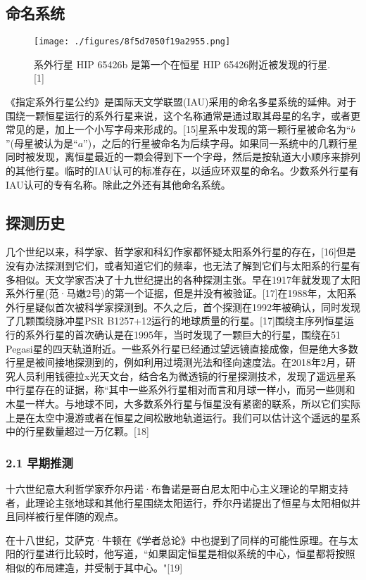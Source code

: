 \subsection{ 命名系统}
\begin{figure}[ht]
\centering
\texttt{[image: ./figures/8f5d7050f19a2955.png]}
\caption{系外行星 HIP 65426b 是第一个在恒星 HIP 65426附近被发现的行星.[1]} \label{fig_TYXWXX_1}
\end{figure}
《指定系外行星公约》是国际天文学联盟(IAU)采用的命名多星系统的延伸。对于围绕一颗恒星运行的系外行星来说，这个名称通常是通过取其母星的名字，或者更常见的是，加上一个小写字母来形成的。[15]星系中发现的第一颗行星被命名为“$b$”(母星被认为是“$a$”)，之后的行星被命名为后续字母。如果同一系统中的几颗行星同时被发现，离恒星最近的一颗会得到下一个字母，然后是按轨道大小顺序来排列的其他行星。临时的IAU认可的标准存在，以适应环双星的命名。少数系外行星有IAU认可的专有名称。除此之外还有其他命名系统。

\subsection{探测历史}
几个世纪以来，科学家、哲学家和科幻作家都怀疑太阳系外行星的存在，[16]但是没有办法探测到它们，或者知道它们的频率，也无法了解到它们与太阳系的行星有多相似。天文学家否决了十九世纪提出的各种探测主张。早在1917年就发现了太阳系外行星(范·马嫩2号)的第一个证据，但是并没有被验证。[17]在1988年，太阳系外行星疑似首次被科学家探测到。不久之后，首个探测在1992年被确认，同时发现了几颗围绕脉冲星PSR B1257+12运行的地球质量的行星。[17]围绕主序列恒星运行的系外行星的首次确认是在1995年，当时发现了一颗巨大的行星，围绕在51 Pegasi星的四天轨道附近。一些系外行星已经通过望远镜直接成像，但是绝大多数行星是被间接地探测到的，例如利用过境测光法和径向速度法。在2018年2月，研究人员利用钱德拉x光天文台，结合名为微透镜的行星探测技术，发现了遥远星系中行星存在的证据，称“其中一些系外行星相对而言和月球一样小，而另一些则和木星一样大。与地球不同，大多数系外行星与恒星没有紧密的联系，所以它们实际上是在太空中漫游或者在恒星之间松散地轨道运行。我们可以估计这个遥远的星系中的行星数量超过一万亿颗。[18]
\subsubsection{2.1 早期推测}
十六世纪意大利哲学家乔尔丹诺·布鲁诺是哥白尼太阳中心主义理论的早期支持者，此理论主张地球和其他行星围绕太阳运行，乔尔丹诺提出了恒星与太阳相似并且同样被行星伴随的观点。

在十八世纪，艾萨克·牛顿在《学者总论》中也提到了同样的可能性原理。在与太阳的行星进行比较时，他写道，“如果固定恒星是相似系统的中心，恒星都将按照相似的布局建造，并受制于其中心。"[19]

